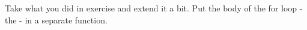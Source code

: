 \begin{Exercise}[title={For-loop II},difficulty=0]
\label{ex:for-loop II}
\Question Take what you did in exercise  and extend it a bit. Put the body of the for loop - the  - in a
separate function.
\end{Exercise}

\begin{Answer}
\Question

\end{Answer}
